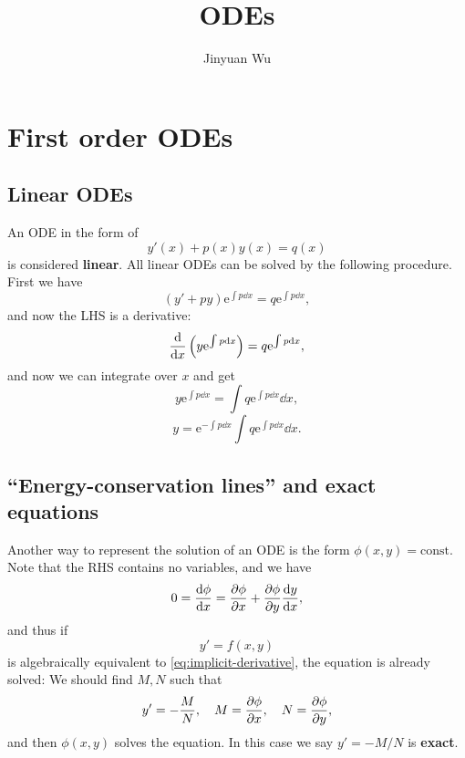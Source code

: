 \documentclass[hyperref, a4paper]{article}
\title{ODEs}
\author{Jinyuan Wu}
\newcommand*{\ee}{\mathrm{e}}
\newcommand*{\const}{\mathrm{const}}
\newcommand*{\concept}[1]{{\textbf{#1}}}
\begin{document}
\maketitle

\section{First order ODEs}

\subsection{Linear ODEs}\label{sec:1st.linear}

An ODE in the form of 
\begin{equation}
    y'(x) + p(x) y(x) = q(x) 
\end{equation}
is considered \concept{linear}.
All linear ODEs can be solved by the following procedure.
First we have 
\begin{equation}
    (y' + py) \ee^{\int p \dd{x}} 
    = q \ee^{\int p \dd{x}},
\end{equation}
and now the LHS is a derivative:
\begin{equation}
    \dv{x} \left(
        y \ee^{\int p \dd{x}}
    \right) = q \ee^{\int p \dd{x}},
\end{equation}
and now we can integrate over $x$ and get 
\begin{equation}
    y \ee^{\int p \dd{x}} = 
    \int q \ee^{\int p \dd{x}} \dd{x},
\end{equation}
\begin{equation}
    y  = \ee^{- \int p \dd{x}}
    \int q \ee^{\int p \dd{x}} \dd{x} .
\end{equation}

\subsection{``Energy-conservation lines'' and exact equations}

Another way to represent the solution of an ODE is 
the form $\phi(x, y) = \const$.
Note that the RHS contains no variables, and we have 
\begin{equation}
    0 = \dv{\phi}{x} = \pdv{\phi}{x} + \pdv{\phi}{y} \dv{y}{x},
    \label{eq:implicit-derivative}
\end{equation}
and thus if 
\begin{equation}
    y' = f(x, y)
\end{equation}
is algebraically equivalent to \eqref{eq:implicit-derivative},
the equation is already solved:
We should find $M, N$ such that 
\begin{equation}
    y' = - \frac{M}{N}, \quad
    M = \pdv{\phi}{x}, \quad
    N = \pdv{\phi}{y},
\end{equation}
and then $\phi(x, y)$ solves the equation.
In this case we say $y' = - M / N$ is \concept{exact}.
\end{document}
